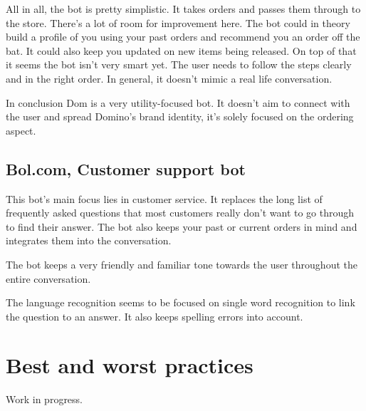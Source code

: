 All in all, the bot is pretty simplistic. It takes orders and passes them through to the store. There's a lot of room for improvement here. The bot could in theory build a profile of you using your past orders and recommend you an order off the bat. It could also keep you updated on new items being released. On top of that it seems the bot isn't very smart yet. The user needs to follow the steps clearly and in the right order. In general, it doesn't mimic a real life conversation.

In conclusion Dom is a very utility-focused bot. It doesn't aim to connect with the user and spread Domino's brand identity, it's solely focused on the ordering aspect.

\subsection{Bol.com, Customer support bot}

This bot's main focus lies in customer service. It replaces the long list of frequently asked questions that most customers really don't want to go through to find their answer. The bot also keeps your past or current orders in mind and integrates them into the conversation.

The bot keeps a very friendly and familiar tone towards the user throughout the entire conversation.

The language recognition seems to be focused on single word recognition to link the question to an answer. It also keeps spelling errors into account.

\section{Best and worst practices}

Work in progress.